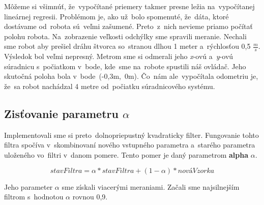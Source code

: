 Môžeme si všimnúť, že~vypočítané priemery takmer presne ležia na~vypočítanej lineárnej regresii. Problémom je, ako už~bolo spomenuté, že~dáta,
ktoré dostávame od~robota sú~veľmi zašumené. Preto~z~nich nevieme priamo počítať polohu robota. Na~zobrazenie veľkosti odchýlky sme spravili
meranie. Nechali sme robot aby prešiel dráhu štvorca so~stranou dlhou 1 meter a~rýchlosťou 0,5 \(\frac{m}{s}\). Výsledok bol veľmi nepresný.
Metrom sme si odmerali jeho \textit{x}-ovú a~\textit{y}-ovú súradnicu s~počiatkom v~bode, kde~sme na~robote spustili náš ovládač. Jeho skutočná
poloha bola v~bode~(-0,3m,~0m). Čo~nám ale~vypočítala odometriu je, že~sa robot nachádzal 4 metre od~počiatku súradnicového systému.

\subsection{Zisťovanie parametru \(\alpha\)}

Implementovali sme si preto~dolnopriepustný kvadraticky filter. Fungovanie tohto filtra spočíva v~skombinovaní nového vstupného parametra a~starého parametra
uloženého vo~filtri v~danom pomere. Tento pomer je daný parametrom \textbf{alpha} $\alpha$.

$$ stavFiltra = \alpha * stavFiltra + (1 - \alpha) * nováVzorka $$

Jeho parameter \(\alpha\) sme získali viacerými meraniami. Začali sme najsilnejším filtrom s~hodnotou $\alpha$ rovnou  0,9.

